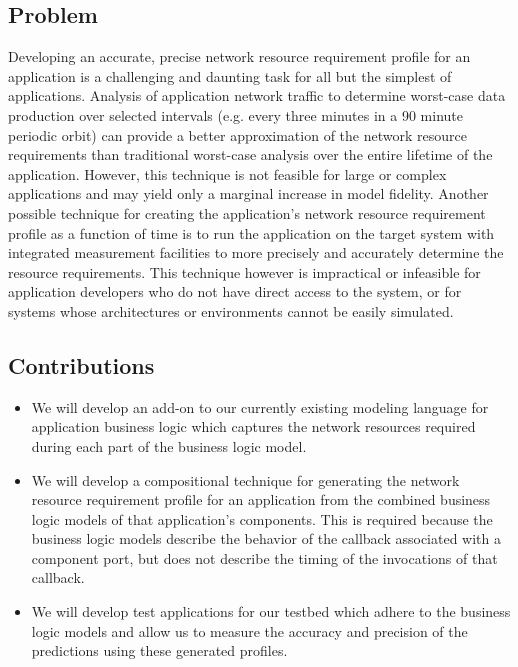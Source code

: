 \subsection{Problem}
Developing an accurate, precise network resource requirement profile
for an application is a challenging and daunting task for all but the
simplest of applications.  Analysis of application network traffic to
determine worst-case data production over selected intervals
(e.g. every three minutes in a 90 minute periodic orbit) can provide a
better approximation of the network resource requirements than
traditional worst-case analysis over the entire lifetime of the
application.  However, this technique is not feasible for large or
complex applications and may yield only a marginal increase in model
fidelity.  Another possible technique for creating the application's
network resource requirement profile as a function of time is to run
the application on the target system with integrated measurement
facilities to more precisely and accurately determine the resource
requirements.  This technique however is impractical or infeasible for
application developers who do not have direct access to the system, or
for systems whose architectures or environments cannot be easily
simulated.

\subsection{Contributions}
\begin{itemize}
	\item We will develop an add-on to our currently existing
          modeling language for application business logic which
          captures the network resources required during each part of
          the business logic model.
	\item We will develop a compositional technique for generating
          the network resource requirement profile for an application
          from the combined business logic models of that
          application's components.  This is required because the
          business logic models describe the behavior of the callback
          associated with a component port, but does not describe the
          timing of the invocations of that callback.
	\item We will develop test applications for our testbed which
          adhere to the business logic models and allow us to measure
          the accuracy and precision of the predictions using these
          generated profiles.
\end{itemize}

\fi
